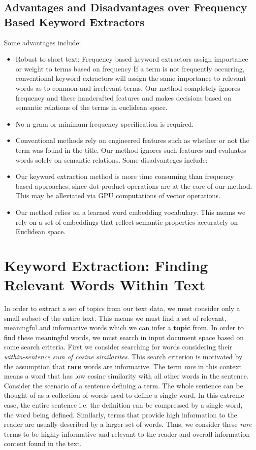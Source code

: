 \documentclass[12pt]{article}
\begin{document}
\subsection{Advantages and Disadvantages over Frequency Based Keyword Extractors}
Some advantages include:
\begin{itemize}
\item Robust to short text: Frequency based keyword extractors assign importance or weight to terms based on frequency If a term is not frequently
occurring, conventional keyword extractors will assign the same importance to relevant words as to common and irrelevant terms. Our method completely
ignores frequency and these handcrafted features and makes decisions based on semantic relations of the terms in euclidean space.
\item No n-gram or minimum frequency specification is required.
\item Conventional methods rely on engineered features such as whether or not the term was found in the title. Our method ignores such features and
evaluates words solely on semantic relations.
Some disadvanteges include:
\item Our keyword extraction method is more time consuming than frequency based approaches, since dot product operations are at the core of our method. This
may be alleviated via GPU computations of vector operations.
\item Our method relies on a learned word embedding vocabulary. This means we rely on a set of embeddings that reflect semantic properties accurately on
Euclidean space.
\end{itemize}



\section{Keyword Extraction: Finding Relevant Words Within Text}
In order to extract a set of topics from our text data, we must consider only a small subset of the entire text. This means we must find a set of
relevant, meaningful and informative words which we can infer a $\textbf{topic}$ from. In order to find these meaningful words, we must search in
input document space based on some search criteria. First we consider searching for words considering their \textit{within-sentence sum of cosine similarites}.
This search criterion is motivated by the assumption that \textbf{rare} words are informative. The term \textit{rare} in this context means a word
that has low cosine similarity with all other words in the sentence. Consider the scenario of a sentence defining a term. The whole sentence can be
thought of as a collection of words used to define a single word. In this extreme case, the entire sentence i.e. the definition can be compressed by a
single word, the word being defined. Similarly, terms that provide high information to the reader are usually described by a larger set of words.
Thus, we consider these \textit{rare} terms to be highly informative and relevant to the reader and overall information content found in the text.
\end{document}
